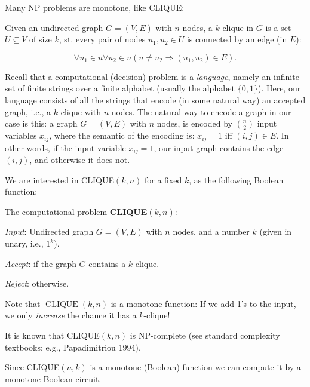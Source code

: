 Many NP problems are monotone, like CLIQUE:

Given an undirected graph $G=(V, E)$ with $n$ nodes, a $k$-clique in $G$ is a set $U\subseteq V$ of size $k$, st. every pair of nodes $u_1, u_2 \in U$ is connected by an edge (in $E$):

$$
 \forall u_1 \in u \forall u_2 \in u ( u \neq u_2\Rightarrow (u_1, u_2)\in E).
$$


Recall that a computational (decision) problem is a \emph{language}, namely an infinite set of finite strings over a finite alphabet (usually the alphabet $\{0,1\}$). Here, our language consists of all the strings that encode (in some natural way) an accepted graph, i.e., a $k$-clique with $n$ nodes.
The natural way to encode a graph in our case is this: a graph  $G=(V, E) $ with $n$ nodes, is encoded by $\binom{n}{2}$ input variables  $x_{ij}$, where the semantic of the encoding is: $x_{i j}=1$ iff $(i, j) \in E$. In other words, if the input variable $x_{ij}=1$,   our input graph contains the edge $(i,j)$, and otherwise it does not. 

We are interested in CLIQUE$(k, n)$ for a fixed $k$, as the following Boolean function: 
\begin{svgraybox}
The computational problem \textbf{CLIQUE$(k, n)$}: 

\textit{Input}: Undirected graph $G=(V,E)$ with $n$ nodes, and a number $k$ (given in unary, i.e., $1^k$).

\textit{Accept}: if the graph $G$ contains a $k$-clique. 

\textit{Reject}: otherwise.
\end{svgraybox}


 Note that $\operatorname{CLIQUE}(k, n)$ is a monotone function: If we add 1's to the input, we only \emph{increase} the chance it has a $k$-clique!
 
It is known that CLIQUE$(k,n)$ is NP-complete (see standard complexity textbooks; e.g., Papadimitriou 1994).


Since CLIQUE$(n, k)$ is a monotone (Boolean)
function we can compute it by a monotone Boolean circuit.

